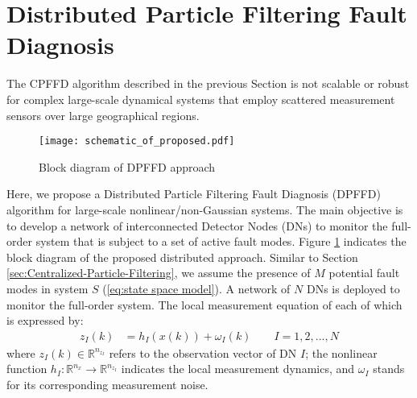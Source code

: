 \documentclass[10pt,twocolumn,twoside]{IEEEtran}
\begin{document}
\section{Distributed Particle Filtering Fault Diagnosis }\label{sec:Distributed-Particle-Filtering}

The CPFFD algorithm described in the previous Section is not scalable
or robust for complex large-scale dynamical systems that employ scattered
measurement sensors over large geographical regions. 





\begin{figure}
\centering{}\texttt{[image: schematic\_of\_proposed.pdf]}\caption{Block diagram of DPFFD approach \label{fig:Proposed-distributed-fault}}
\end{figure}

Here, we propose a Distributed Particle Filtering Fault Diagnosis
(DPFFD) algorithm for large-scale nonlinear/non-Gaussian systems.
The main objective is to develop a network of interconnected Detector
Nodes (DNs) to monitor the full-order system that is subject to a
set of active fault modes. Figure \ref{fig:Proposed-distributed-fault} indicates the block
diagram of the proposed distributed approach. Similar to Section \ref{sec:Centralized-Particle-Filtering}, we assume the presence of $M$
potential fault modes in system $S$ (\ref{eq:state space model}).
A network of $N$ DNs is deployed to monitor the full-order system.
The local measurement equation of each of which is expressed by:
\begin{equation}
\begin{aligned}z_{I}(k) & =h_{I}(x(k))+\omega_{I}(k)\qquad I=1,2,...,N\end{aligned}
\label{eq:local measurement model-1}
\end{equation}
where $z_{I}(k)\in\mathbb{R}^{n_{z_{I}}}$ refers to the observation
vector of DN $I$; the nonlinear function $h_{I}:\mathbb{R}^{n_{x}}\rightarrow\mathbb{R}^{n_{z_{I}}}$
indicates the local measurement dynamics, and $\omega_{I}$ stands
for its corresponding measurement noise.
\end{document}
